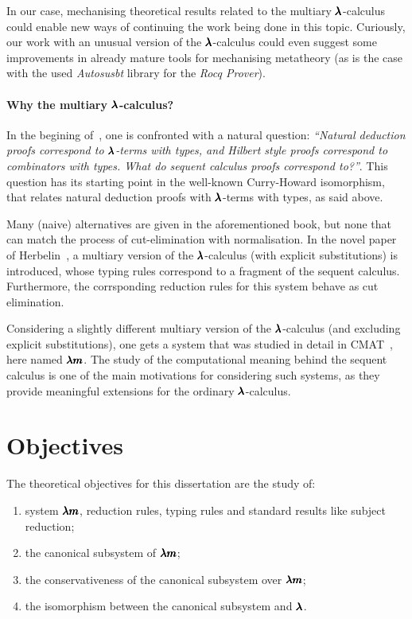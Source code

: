 In our case, mechanising theoretical results related to the multiary $\pmb{\lambda}$-calculus could enable new ways of continuing the work being done in this topic.
Curiously, our work with an unusual version of the $\pmb{\lambda}$-calculus could even suggest some improvements in already mature tools for mechanising metatheory (as is the case with the used \textit{Autosusbt} library for the \textit{Rocq Prover}).

\paragraph{Why the multiary $\pmb{\lambda}$-calculus?}
In the begining of~\cite[Chapter~7.3]{CurryHoward}, one is confronted with a natural question: \textit{``Natural deduction proofs correspond to $\pmb{\lambda}$-terms with types, and Hilbert style proofs correspond to combinators with types. What do sequent calculus proofs correspond to?''}.
This question has its starting point in the well-known Curry-Howard isomorphism, that relates natural deduction proofs with $\pmb{\lambda}$-terms with types, as said above.

Many (naive) alternatives are given in the aforementioned book, but none that can match the process of cut-elimination with normalisation.
In the novel paper of Herbelin~\cite{Herbelin1994}, a multiary version of the $\pmb{\lambda}$-calculus (with explicit substitutions) is introduced, whose typing rules correspond to a fragment of the sequent calculus.
Furthermore, the corrsponding reduction rules for this system behave as cut elimination.

Considering a slightly different multiary version of the $\pmb{\lambda}$-calculus (and excluding explicit substitutions), one gets a system that was studied in detail in CMAT~\cite{JCES2002, JCESLuis}, here named $\pmb{\lambda m}$.
The study of the computational meaning behind the sequent calculus is one of the main motivations for considering such systems, as they provide meaningful extensions for the ordinary $\pmb{\lambda}$-calculus.

\section{Objectives}
The theoretical objectives for this dissertation are the study of:
\begin{enumerate}
\item system $\pmb{\lambda m}$, reduction rules, typing rules and standard results like subject reduction;
\item the canonical subsystem of $\pmb{\lambda m}$;
\item the conservativeness of the canonical subsystem over $\pmb{\lambda m}$;
\item the isomorphism between the canonical subsystem and $\pmb{\lambda}$.
\end{enumerate}

